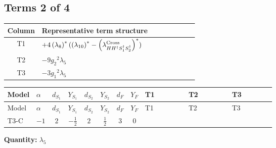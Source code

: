 \documentclass[8pt]{article}
\begin{document}
\begin{landscape}
\subsection*{Terms 2 of 4}
\begin{center}
\begin{tabular}{@{}c >{\raggedright\arraybackslash}p{0.82\linewidth}@{}}
\toprule
Column & Representative term structure \\
\midrule
T1 & \(\displaystyle +4 \left({\lambda_{8}}\right)^{*} (\left({\lambda_{10}}\right)^{*}-\left({\lambda_{H H^\dagger S_1^\dagger S_2^\dagger}^{\rm Cross}}\right)^{*})\) \\
\midrule
T2 & \(\displaystyle -9 {g_2}^2 {\lambda_5}\) \\
\midrule
T3 & \(\displaystyle -3 {g_1}^2 {\lambda_5}\) \\
\midrule
\bottomrule
\end{tabular}
\end{center}
\smallskip
\tiny
\begin{longtable}{@{}llcccccc >{\raggedright\arraybackslash}p{0.21\linewidth} >{\raggedright\arraybackslash}p{0.21\linewidth} >{\raggedright\arraybackslash}p{0.21\linewidth}@{}}
\toprule
Model & $\alpha$ & $d_{S_1}$ & $Y_{S_1}$ & $d_{S_2}$ & $Y_{S_2}$ & $d_F$ & $Y_F$ & T1 & T2 & T3 \\
\midrule
\endfirsthead
\toprule
Model & $\alpha$ & $d_{S_1}$ & $Y_{S_1}$ & $d_{S_2}$ & $Y_{S_2}$ & $d_F$ & $Y_F$ & T1 & T2 & T3 \\
\midrule
\endhead
T3-C & $-1$ & $2$ & $-\frac{1}{2}$ & $2$ & $\frac{1}{2}$ & $3$ & $0$ & \scriptsize\adjustbox{max width=\linewidth}{$\begin{gathered} +4 \left({\lambda_{8}}\right)^{*} (\left({\lambda_{10}}\right)^{*}-\left({\lambda_{H H^\dagger S_1^\dagger S_2^\dagger}^{\rm Cross}}\right)^{*})\end{gathered}$} & \scriptsize\adjustbox{max width=\linewidth}{$\begin{gathered} -9 {g_2}^2 {\lambda_5}\end{gathered}$} & \scriptsize\adjustbox{max width=\linewidth}{$\begin{gathered} -3 {g_1}^2 {\lambda_5}\end{gathered}$} \\
\midrule
\bottomrule
\end{longtable}
\clearpage
\noindent\textbf{Quantity: }$\lambda_5$\par\smallskip

\end{landscape}
\end{document}
